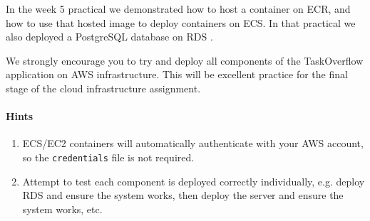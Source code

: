 \documentclass{csse4400}
\begin{document}
In the week 5 practical we demonstrated how to host a container on ECR,
and how to use that hosted image to deploy containers on ECS.
In that practical we also deployed a PostgreSQL database on RDS \cite{prac-week5}.

We strongly encourage you to try and deploy all components of the TaskOverflow application on AWS infrastructure.
This will be excellent practice for the final stage of the cloud infrastructure assignment.

\paragraph{Hints}
\begin{enumerate}
    \item ECS/EC2 containers will automatically authenticate with your AWS account,
          so the \texttt{credentials} file is not required.
    \item Attempt to test each component is deployed correctly individually,
          e.g. deploy RDS and ensure the system works, then deploy the server and ensure the system works, etc.
\end{enumerate}




\end{document}
